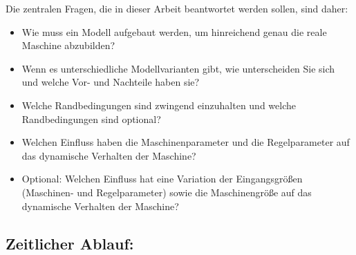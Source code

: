 Die zentralen Fragen, die in dieser Arbeit beantwortet werden sollen,
sind daher:

\begin{itemize}
\tightlist
\item
  Wie muss ein Modell aufgebaut werden, um hinreichend genau die reale
  Maschine abzubilden?
\item
  Wenn es unterschiedliche Modellvarianten gibt, wie unterscheiden Sie
  sich und welche Vor- und Nachteile haben sie?
\item
  Welche Randbedingungen sind zwingend einzuhalten und welche
  Randbedingungen sind optional?
\item
  Welchen Einfluss haben die Maschinenparameter und die Regelparameter
  auf das dynamische Verhalten der Maschine?
\item
  Optional: Welchen Einfluss hat eine Variation der Eingangsgrößen
  (Maschinen- und Regelparameter) sowie die Maschinengröße auf das
  dynamische Verhalten der Maschine?
\end{itemize}

\hypertarget{zeitlicher-ablauf}{%
\subsection{Zeitlicher Ablauf:}\label{zeitlicher-ablauf}}

